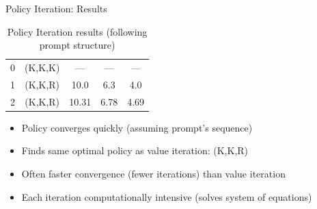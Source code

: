 \documentclass[10pt]{beamer}
\begin{document}
\begin{frame}{Policy Iteration: Results}
\begin{table}
\begin{tabular}{ccccc}
             0 & (K,K,K) & --- & --- & --- \\
             1 & (K,K,R) & 10.0 & 6.3 & 4.0 \\ %
             2 & (K,K,R) & 10.31 & 6.78 & 4.69 \\ %
            \bottomrule
        \end{tabular}
         \caption{Policy Iteration results (following prompt structure)}
    \end{table}

    \begin{itemize}
        \item Policy converges quickly (assuming prompt's sequence)
        \item Finds same optimal policy as value iteration: (K,K,R)
        \item Often faster convergence (fewer iterations) than value iteration
        \item Each iteration computationally intensive (solves system of equations)
    \end{itemize}
\end{frame}

\end{document}

